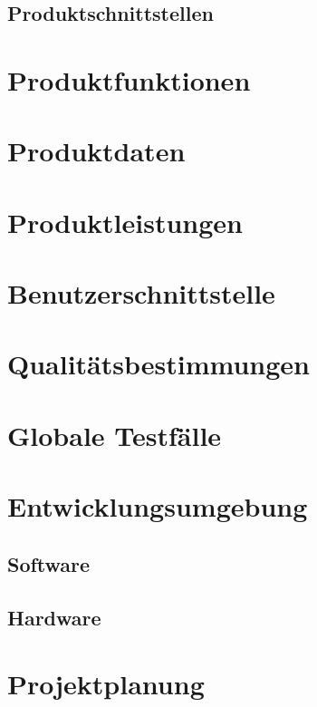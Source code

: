 \documentclass[a4paper,12pt]{scrreprt}
\begin{document}
		
		
	\section{Produktschnittstellen}
		
		
		
\chapter{Produktfunktionen}
	
		
\chapter{Produktdaten}
	


\chapter{Produktleistungen}
	
	
	
\chapter{Benutzerschnittstelle}
	
	
	
\chapter{Qualitätsbestimmungen}
	
	
	
\chapter{Globale Testfälle}
	
	
	
\chapter{Entwicklungsumgebung}
	
	\section{Software}
		
		
		
	\section{Hardware}
		
		
		
\chapter{Projektplanung}



	
	
\end{document}
